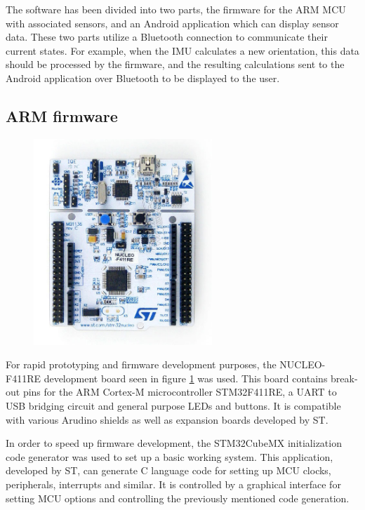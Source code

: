 The software has been divided into two parts, the firmware for the ARM MCU with associated sensors, and an Android application which can display sensor data. These two parts utilize a Bluetooth connection to communicate their current states. For example, when the IMU calculates a new orientation, this data should be processed by the firmware, and the resulting calculations sent to the Android application over Bluetooth to be displayed to the user.

\subsection{ARM firmware}

\begin{figure}[H]
\centering
\includegraphics[width=0.6\textwidth]{Figures/stm32nucleo.jpg}
\caption{}
\label{nucleo-board}
\end{figure}

For rapid prototyping and firmware development purposes, the NUCLEO-F411RE development board seen in figure \ref{nucleo-board} was used. This board contains break-out pins for the ARM Cortex-M microcontroller STM32F411RE, a UART to USB bridging circuit and general purpose LEDs and buttons. It is compatible with various Arudino shields as well as expansion boards developed by ST.

In order to speed up firmware development, the STM32CubeMX \cite{stm32cubemx} initialization code generator was used to set up a basic working system. This application, developed by ST, can generate C language code for setting up MCU clocks, peripherals, interrupts and similar. It is controlled by a graphical interface for setting MCU options and controlling the previously mentioned code generation.

